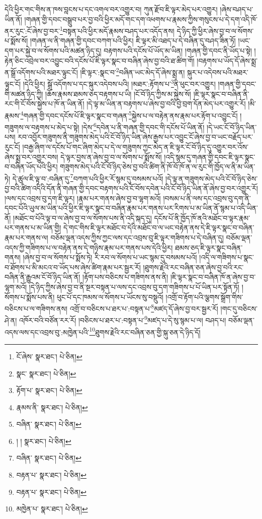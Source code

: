 དེའི་ཕྱིར་གང་གིས་ན་ཁས་བླངས་པ་དང་འགལ་བར་འགྱུར་བ། ཀུན་རྫོབ་ཇི་ལྟར་མེད་པར་འགྱུར། །ཞེས་བཤད་པ་ཡིན་ནོ། །གཞན་གྱི་དབང་བསྒྲུབ་པར་བྱ་བའི་ཕྱིར་མདོ་གང་དག་འཕགས་པ་རྣམས་ཀྱིས་གསུངས་པ་དེ་དག་འདི་ཁོ་ནར་རུང་:ངོ་ཞེས་བྱ་བར་\footnote{ངོ་ཞེས་  སྣར་ཐང་།  པེ་ཅིན། }བསྟན་པའི་ཕྱིར་མདོ་རྣམས་བཤད་པར་འདོད་ནས། དེ་ཉིད་ཀྱི་ཕྱིར་ཞེས་བྱ་བ་ལ་སོགས་པ་སྨོས་སོ། །གཞན་ལ་ནི་གཞན་གྱི་དབང་བཀག་པའི་ཕྱིར། ཇི་ལྟར་མི་འཐད་པ་དེ་བཞིན་དུ་བཤད་ཟིན་ཏོ། །ཡང་དག་པར་སྐྱེ་བ་ལ་སོགས་པའི་མཚན་ཉིད་དུ། བརྟགས་པའི་དངོས་པོ་ཡོད་མ་ཡིན། །གཞན་གྱི་དབང་ནི་ཡོད་པ་སྟེ། །རྟེན་ཅིང་འབྲེལ་བར་འབྱུང་བའི་དངོས་པོ་ཇི་ལྟར་སྣང་བ་བཞིན་ཞེས་བྱ་བའི་ཐ་ཚིག་གོ། །བརྟགས་པ་ཡོད་དོ་ཞེས་སྨྲ་ན་སྒྲོ་འདོགས་པའི་མཐར་ལྟུང་ངོ། །ཇི་ལྟར་:སྣང་བ་\footnote{སྣང་  སྣར་ཐང་།  པེ་ཅིན། }བཞིན་ཡང་མེད་དོ་ཞེས་སྨྲ་ན། སྐུར་པ་འདེབས་པའི་མཐར་ལྟུང་ངོ། །དེའི་ཕྱིར། སྒྲོ་འདོགས་པ་དང་སྐུར་འདེབས་པའི། །མཐར་:རྟོགས་པ་\footnote{རྟོག་པ་  སྣར་ཐང་།  པེ་ཅིན། }ནི་ཕུང་བར་འགྱུར། །གཞན་གྱི་དབང་གི་མཚན་ཉིད་ཀྱི། །ཆོས་རྣམས་ཐམས་ཅད་བརྟགས་པ་ཡི། །ངོ་བོ་ཉིད་ཀྱིས་མ་སྐྱེས་སོ། །ཇི་ལྟར་སྣང་བ་བཞིན་ནི་རང་གི་ངོ་བོས་སྐྱེས་པ་ཁོ་ན་ཡིན་ནོ། །དེ་ལྟ་མ་ཡིན་ན་བརྟགས་པ་ཞེས་བྱ་བའི་བྱེ་བྲག་དོན་མེད་པར་འགྱུར་རོ། །མི་རྣམས་\footnote{རྣམས་ནི་  སྣར་ཐང་།  པེ་ཅིན། }གཞན་གྱི་དབང་དངོས་པོ་ཇི་ལྟར་སྣང་བ་གཞན་\footnote{བཞིན་  སྣར་ཐང་།  པེ་ཅིན། }སྐྱེས་པ་ལ་བརྟེན་ནས་རྣམ་པར་རྟོག་པ་འབྱུང་ངོ། །གཟུགས་ལ་བརྟགས་པ་མེད་པ་སྟེ། །དེས་\footnote{། །  སྣར་ཐང་།  པེ་ཅིན། }དབེན་པ་ནི་གཞན་གྱི་དབང་གི་དངོས་པོ་ཡིན་ནོ། །དེ་ཡང་ངོ་བོ་ཉིད་ཡིན་པས། རབ་འབྱོར་གཟུགས་ནི་གཟུགས་མེད་པའི་ངོ་བོ་ཉིད་ཡིན་ཞེས་རྒྱས་པར་འབྱུང་ངོ་ཞེས་བྱ་བ་ཡང་བརྗོད་པར་རུང་ངོ། །བརྒྱ་ཞིག་ལ་དངོས་པོ་གང་ཞིག་མེད་པ་དེ་ལ་གཟུགས་ཀྱང་མེད་ན་ཇི་ལྟར་ངོ་བོ་ཉིད་དུ་འགྱུར་བར་འོས་ཞེས་སྨྲ་བར་འགྱུར་བས། དེ་ལྟར་བྱས་ན་ཞེས་བྱ་བ་ལ་སོགས་པ་སྨོས་སོ། །འདི་སྙམ་དུ་གཞན་གྱི་དབང་ཇི་ལྟར་སྣང་བ་བཞིན་ཡོད་པའི་ཕྱིར། གཟུགས་མེད་པའི་ངོ་བོ་ཉིད་ཅེས་བྱ་བའི་ཚིག་ནི་ཁོ་བོ་ཁོ་ན་ལ་རུང་གི་ཁྱོད་ལ་ནི་མ་ཡིན་ཏེ། དེ་ཚུལ་ཇི་ལྟ་བ་:བཞིན་དུ་\footnote{བཞིན་  སྣར་ཐང་།  པེ་ཅིན། }བཀག་པའི་ཕྱིར་རོ་སྙམ་དུ་བསམས་པའོ། །དེ་ལྟ་ན་གཟུགས་མེད་པའི་ངོ་བོ་ཉིད་ཅེས་བྱ་བའི་ཚིག་འདིའི་དོན་ནི་གཞན་གྱི་དབང་བརྟགས་པའི་ངོ་བོས་དབེན་པའི་ངོ་བོ་ཉིད་ཡིན་ནོ་ཞེས་བྱ་བར་འགྱུར་རོ། །ལས་དང་འབྲས་བུ་དག་ཇི་ལྟར། །རྣམ་པར་གནས་ཞེས་བྱ་བ་ལྷག་མའོ། །བསམ་པ་ནི་ལས་དང་འབྲས་བུ་དག་ནི་དབང་པོའི་ཡུལ་མ་ཡིན་པའི་ཕྱིར་ཇི་ལྟར་སྣང་བ་བཞིན་རྣམ་པར་གནས་པར་རིགས་པ་མ་ཡིན་ནོ་སྙམ་པ་འདི་ཡིན་ནོ། །མཐོང་བ་པོའི་ལྟ་བ་ལ་ཞེས་བྱ་བ་ལ་སོགས་པས་ནི་འདི་སྐད་དུ། དངོས་པོ་ནི་ཁྱོད་ཁོ་ནའི་མཐོང་བ་ལྟར་རྣམ་པར་གནས་པ་མ་ཡིན་གྱི། དེ་གང་གིས་ཇི་ལྟར་མཐོང་བ་དེའི་མཐོང་བ་ལ་ཡང་བརྟེན་ནས་དེ་ཇི་ལྟར་སྣང་བ་བཞིན་རྣམ་པར་གནས་ལ། བཅོམ་ལྡན་འདས་ཀྱིས་ཀྱང་ལས་དང་འབྲས་བུ་ཇི་ལྟར་གཟིགས་པ་དེ་བཞིན་དུ། བཅོམ་ལྡན་འདས་ཀྱི་གཟིགས་པ་ལ་བརྟེན་ནས་དེ་གཉིས་རྣམ་པར་གནས་པས་དེའི་ཕྱིར། ཐམས་ཅད་ཇི་ལྟར་སྣང་བཞིན་གནས། །ཞེས་བྱ་བ་ལ་སོགས་པ་སྨོས་ཏེ། རི་རབ་ལ་སོགས་པ་ཡང་སྙམ་དུ་བསམས་པའོ། །འདི་ལ་གཟིགས་པ་སྣང་བ་ཐོགས་པ་མི་མངའ་བ་ཡོད་པས་ཞེས་ཚིག་རྣམ་པར་སྦྱར་རོ། །ཐུགས་རྗེའི་རང་བཞིན་ཅན་ཞེས་བྱ་བའི་རང་བཞིན་ནི་རྒྱུའམ་ངོ་བོ་ཉིད་ཡིན་ནོ། །རྟོག་པས་བཅིངས་པ་གཟིགས་ནས་ནི། །ཇི་ལྟར་སྣང་བ་བཞིན་ཁོ་ན་ཞེས་བྱ་བ་ལྷག་མའོ། །དེ་ཉིད་ཀྱིས་ཞེས་བྱ་བ་ནི་སྔར་བསྟན་པ་ལས་དང་འབྲས་བུ་དག་གཟིགས་པ་པོ་ཡིན་པར་སྟོན་ཏོ། །སོགས་པ་སྨོས་པས་ནི། ཕུང་པོ་དང་ཁམས་ལ་སོགས་པ་ཡོངས་སུ་བསྡུའོ། །འགྲོ་བ་རྟོག་པའི་ལྕགས་སྒྲོག་གིས་བཅིངས་པ་ལ་གཟིགས་ནས། འགྲོ་བ་བཅིངས་པ་ཐར་པ་:བསྟན་པ་\footnote{བརྟན་པ་  སྣར་ཐང་།  པེ་ཅིན། }མཛད་དོ་ཞེས་བྱ་བར་སྦྱར་རོ། །གང་དུ་བཅིངས་ཤེ་ན། འཁོར་བའི་བཙོན་རར་རོ། །བཅིངས་པ་ཐར་པ་:བསྟན་པ་\footnote{བརྟན་པ་  སྣར་ཐང་།  པེ་ཅིན། }མཛད་པ་དེ་སུ་སྙམ་པ་ལ། བཤད་པ། བཅོམ་ལྡན་འདས་ལས་དང་འབྲས་བུ་:མཁྱེན་པའི་\footnote{མཁྱེན་པ་  སྣར་ཐང་།  པེ་ཅིན། }ཐུགས་རྗེའི་རང་བཞིན་ཅན་གྱི་སྐུ་ཅན་དེ་ཉིད་དོ། 